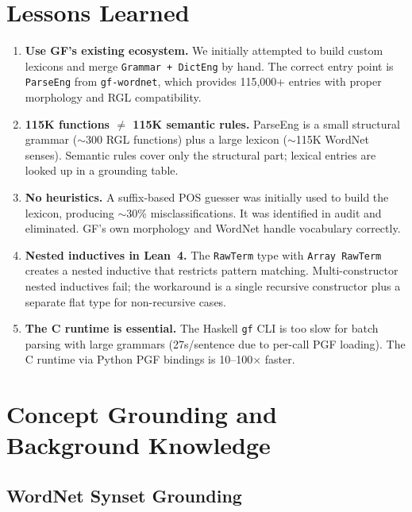 \documentclass[]{article}
\newcommand{\code}[1]{\texttt{#1}}
\begin{document}
\section{Lessons Learned}
\label{sec:lessons}

\begin{enumerate}
\item \textbf{Use GF's existing ecosystem.} We initially attempted to
  build custom lexicons and merge \code{Grammar + DictEng} by hand.
  The correct entry point is \code{ParseEng} from \code{gf-wordnet},
  which provides 115{,}000+ entries with proper morphology and RGL
  compatibility.

\item \textbf{115K functions $\neq$ 115K semantic rules.} ParseEng
  is a small structural grammar ($\sim$300 RGL functions) plus a
  large lexicon ($\sim$115K WordNet senses). Semantic rules cover
  only the structural part; lexical entries are looked up in a
  grounding table.

\item \textbf{No heuristics.} A suffix-based POS guesser was initially
  used to build the lexicon, producing $\sim$30\% misclassifications.
  It was identified in audit and eliminated. GF's own morphology and
  WordNet handle vocabulary correctly.

\item \textbf{Nested inductives in Lean~4.} The \code{RawTerm} type
  with \code{Array RawTerm} creates a nested inductive that restricts
  pattern matching. Multi-constructor nested inductives fail; the
  workaround is a single recursive constructor plus a separate flat
  type for non-recursive cases.

\item \textbf{The C runtime is essential.} The Haskell \code{gf} CLI
  is too slow for batch parsing with large grammars (27s/sentence
  due to per-call PGF loading). The C runtime via Python PGF bindings
  is 10--100$\times$ faster.
\end{enumerate}

\section{Concept Grounding and Background Knowledge}
\label{sec:grounding}

\subsection{WordNet Synset Grounding}
\end{document}
